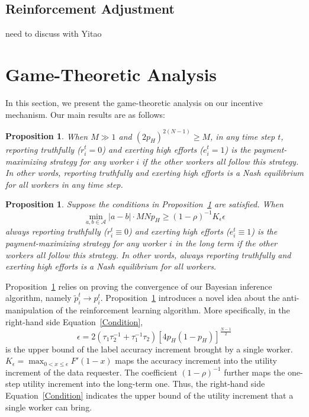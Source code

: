 \documentclass{article}
\newtheorem{proposition}[theorem]{Proposition}
\begin{document}
\subsection{Reinforcement Adjustment}
need to discuss with Yitao




\section{Game-Theoretic Analysis}
In this section, we present the game-theoretic analysis on our incentive mechanism. Our main results are as follows:
\begin{proposition}
\label{OSEqulibrium}
When $M\gg 1$ and $(2p_H)^{2(N-1)} \geq M$, in any time step $t$, reporting truthfully ($r^{t}_i = 0$) and exerting high efforts ($e^{t}_i=1$) is the payment-maximizing strategy for any worker $i$ if the other workers all follow this strategy. In other words, reporting truthfully and exerting high efforts is a Nash equilibrium for all workers in any time step.
\end{proposition}
\begin{proposition}
\label{RMNE}
Suppose the conditions in Proposition~\ref{OSEqulibrium} are satisfied. When
\begin{equation}
\label{Condition}
{\min}_{a,b\in\mathcal{A}}|a-b|\cdot MNp_H\geq (1-\rho)^{-1} K_{\epsilon} \epsilon
\end{equation}
always reporting truthfully ($r^{t}_i \equiv 0$) and exerting high efforts ($e^{t}_i\equiv 1$) is the payment-maximizing strategy for any worker $i$ in the long term if the other workers all follow this strategy.
In other words, always reporting truthfully and exerting high efforts is a Nash equilibrium for all workers.
\end{proposition}
Proposition~\ref{OSEqulibrium} relies on proving the convergence of our Bayesian inference algorithm, namely $\tilde{p}_i^t\rightarrow p_i^t$.
Proposition~\ref{RMNE} introduces a novel idea about the anti-manipulation of the reinforcement learning algorithm.
More specifically, in the right-hand side Equation~\ref{Condition},
\begin{equation}
\epsilon =2(\tau_1\tau_2^{-1}+\tau_1^{-1}\tau_2)[4p_H(1-p_H)]^{\frac{N-1}{2}}
\end{equation}
is the upper bound of the label accuracy increment brought by a single worker.
$K_{\epsilon}={\max}_{0<x\leq \epsilon}F'(1-x)$ maps the accuracy increment into the utility increment of the data requester.
The coefficient $(1-\rho)^{-1}$ further maps the one-step utility increment into the long-term one. Thus, the right-hand side Equation~\ref{Condition} indicates the upper bound of the utility increment that a single worker can bring.
\end{document}
